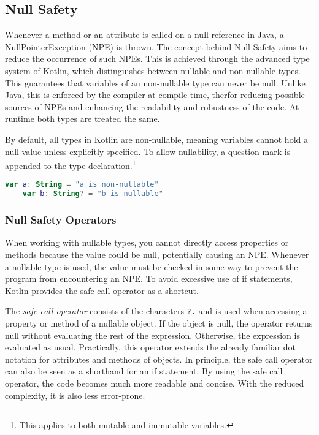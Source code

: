 \documentclass[a4paper, 11pt]{article}
\begin{document}
\subsection{Null Safety}
  Whenever a method or an attribute is called on a null reference in Java, a NullPointerException (NPE) is thrown. The concept behind Null Safety aims to reduce the occurrence of such NPEs. This is achieved through the advanced type system of Kotlin, which distinguishes between nullable and non-nullable types. This guarantees that variables of an non-nullable type can never be null. Unlike Java, this is enforced by the compiler at compile-time, therfor reducing possible sources of NPEs and enhancing the readability and robustness of the code. At runtime both types are treated the same.
  
  By default, all types in Kotlin are non-nullable, meaning variables cannot hold a null value unless explicitly specified. To allow nullability, a question mark is appended to the type declaration.\footnote{This applies to both mutable and immutable variables.}

  \begin{lstlisting}[language=Kotlin]
    var a: String = "a is non-nullable"
    var b: String? = "b is nullable"
  \end{lstlisting}
  
\subsubsection{Null Safety Operators}
  When working with nullable types, you cannot directly access properties or methods because the value could be null, potentially causing an NPE. Whenever a nullable type is used, the value must be checked in some way to prevent the program from encountering an NPE. To avoid excessive use of if statements, Kotlin provides the safe call operator as a shortcut.

  The \textit{safe call operator} consists of the characters \texttt{?.} and is used when accessing a property or method of a nullable object. If the object is null, the operator returns null without evaluating the rest of the expression. Otherwise, the expression is evaluated as usual. Practically, this operator extends the already familiar dot notation for attributes and methods of objects. In principle, the safe call operator can also be seen as a shorthand for an if statement. By using the safe call operator, the code becomes much more readable and concise. With the reduced complexity, it is also less error-prone.
\end{document}
